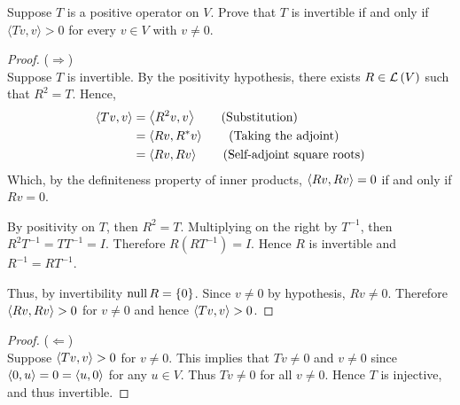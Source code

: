 Suppose $T$ is a positive operator on $V$. Prove that $T$ is invertible if and only if $\langle Tv,v \rangle >0$ for every $v \in V$ with $v \ne 0$.

\begin{proof} ($\Longrightarrow$)\\
    Suppose $T$ is invertible. By the positivity hypothesis, there exists $R \in \mathcal{L}\left({V}\right)$ such that $R^2 = T$. Hence, 
    \begin{align*}
        \inner{Tv, v}
        &= \inner{R^2v, v} \tag{Substitution}\\
        &= \inner{Rv, R^*v} \tag{Taking the adjoint}\\
        &= \inner{Rv, Rv} \tag{Self-adjoint square roots}\\
    \end{align*}
    Which, by the definiteness property of inner products, $\inner{Rv, Rv} = 0$ if and only if $Rv = 0$.
    
    \nl By positivity on $T$, then $R^2 = T$. Multiplying on the right by $T^{-1}$, then $R^2T^{-1} = TT^{-1} = I$. Therefore $R(RT^{-1}) = I$. Hence $R$ is invertible and $R^{-1} = RT^{-1}$. 
    
    \nl Thus, by invertibility $\operatorname{null} R = \{0\}$. Since $v \neq 0$ by hypothesis, $Rv \neq 0$.  Therefore $\inner{Rv,Rv} > 0$ for $v \neq 0$ and hence $\inner{Tv,v} >0$.
\end{proof}

\begin{proof} ($\Longleftarrow$)\\
    Suppose $\inner{Tv,v} > 0$ for $v \neq 0$. This implies that $Tv \neq 0$ and $v \neq 0$ since $\inner{0,u} = 0 = \inner{u,0}$ for any $u \in V$. Thus $Tv \neq 0$ for all $v \neq 0$. Hence $T$ is injective, and thus invertible.
\end{proof}